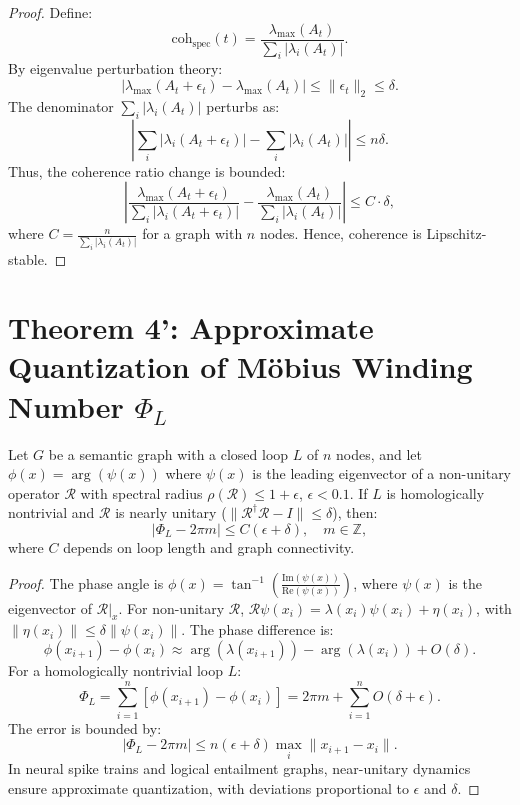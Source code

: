 \documentclass[12pt]{article}
\begin{document}
\begin{proof}
Define:
\[
\text{coh}_{\text{spec}}(t) = \frac{\lambda_{\max}(A_t)}{\sum_i |\lambda_i(A_t)|}.
\]
By eigenvalue perturbation theory:
\[
|\lambda_{\max}(A_t + \epsilon_t) - \lambda_{\max}(A_t)| \leq \|\epsilon_t\|_2 \leq \delta.
\]
The denominator \(\sum_i |\lambda_i(A_t)|\) perturbs as:
\[
\left| \sum_i |\lambda_i(A_t + \epsilon_t)| - \sum_i |\lambda_i(A_t)| \right| \leq n \delta.
\]
Thus, the coherence ratio change is bounded:
\[
\left| \frac{\lambda_{\max}(A_t + \epsilon_t)}{\sum_i |\lambda_i(A_t + \epsilon_t)|} - \frac{\lambda_{\max}(A_t)}{\sum_i |\lambda_i(A_t)|} \right| \leq C \cdot \delta,
\]
where \(C = \frac{n}{\sum_i |\lambda_i(A_t)|}\) for a graph with \(n\) nodes. Hence, coherence is Lipschitz-stable.
\end{proof}

\section*{Theorem 4': Approximate Quantization of Möbius Winding Number \(\Phi_L\)}
\begin{theorem}
Let \(G\) be a semantic graph with a closed loop \(L\) of \(n\) nodes, and let \(\phi(x) = \arg(\psi(x))\) where \(\psi(x)\) is the leading eigenvector of a non-unitary operator \(\mathcal{R}\) with spectral radius \(\rho(\mathcal{R}) \leq 1 + \epsilon\), \(\epsilon < 0.1\). If \(L\) is homologically nontrivial and \(\mathcal{R}\) is nearly unitary (\(\|\mathcal{R}^\dagger \mathcal{R} - I\| \leq \delta\)), then:
\[
\left| \Phi_L - 2\pi m \right| \leq C (\epsilon + \delta), \quad m \in \mathbb{Z},
\]
where \(C\) depends on loop length and graph connectivity.
\end{theorem}

\begin{proof}
The phase angle is \(\phi(x) = \tan^{-1}\left(\frac{\text{Im}(\psi(x))}{\text{Re}(\psi(x))}\right)\), where \(\psi(x)\) is the eigenvector of \(\mathcal{R}|_x\). For non-unitary \(\mathcal{R}\), \(\mathcal{R}\psi(x_i) = \lambda(x_i) \psi(x_i) + \eta(x_i)\), with \(\|\eta(x_i)\| \leq \delta \|\psi(x_i)\|\). The phase difference is:
\[
\phi(x_{i+1}) - \phi(x_i) \approx \arg(\lambda(x_{i+1})) - \arg(\lambda(x_i)) + O(\delta).
\]
For a homologically nontrivial loop \(L\):
\[
\Phi_L = \sum_{i=1}^n [\phi(x_{i+1}) - \phi(x_i)] = 2\pi m + \sum_{i=1}^n O(\delta + \epsilon).
\]
The error is bounded by:
\[
\left| \Phi_L - 2\pi m \right| \leq n (\epsilon + \delta) \max_i \|x_{i+1} - x_i\|.
\]
In neural spike trains and logical entailment graphs, near-unitary dynamics ensure approximate quantization, with deviations proportional to \(\epsilon\) and \(\delta\).
\end{proof}
\end{document}
